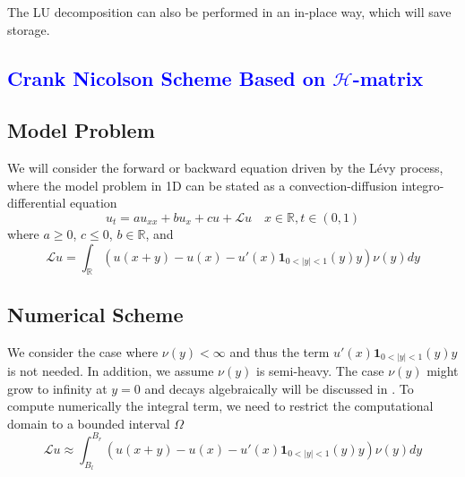 \documentclass[10pt,a4paper]{article}
\newcommand{\RR}[0]{\mathbb{R}}
\newcommand{\lib}[1]{\textcolor{blue}{\section{#1}}}
\theoremstyle{definition}
\begin{document}
The LU decomposition can also be performed in an in-place way, which will save storage. 

 
\lib{Crank Nicolson Scheme Based on $\mathcal{H}$-matrix} 
 
 
 \subsection{Model Problem}
 We will consider the forward or backward equation driven by the L\'evy process, where the model problem in 1D can be stated as a convection-diffusion integro-differential equation
\begin{equation}\label{equ:ut}
	u_t = a u_{xx} + bu_x + cu + \mathcal{L}u\quad x\in \RR, t\in (0,1)
\end{equation}
where $a\geq 0$, $c\leq 0$, $b\in\RR$, and
\begin{equation}
	\mathcal{L}u = \int_\RR (u(x+y)-u(x)-u'(x)\mathbf{1}_{0<|y|<1}(y)y)\nu(y)dy
\end{equation}  


 \subsection{Numerical Scheme}

We consider the case where $\nu(y)<\infty$ and thus the term $u'(x)\mathbf{1}_{0<|y|<1}(y)y$ is not needed. In addition, we assume $\nu(y)$ is semi-heavy.   The case $\nu(y)$ might grow to infinity at $y=0$ and decays algebraically will be discussed in . To compute numerically the integral term, we need to restrict the computational domain to a bounded interval $\Omega$
\begin{equation}
	\mathcal{L}u \approx \int_{B_l}^{B_r} (u(x+y)-u(x)-u'(x)\mathbf{1}_{0<|y|<1}(y)y)\nu(y)dy
\end{equation}
\end{document}
